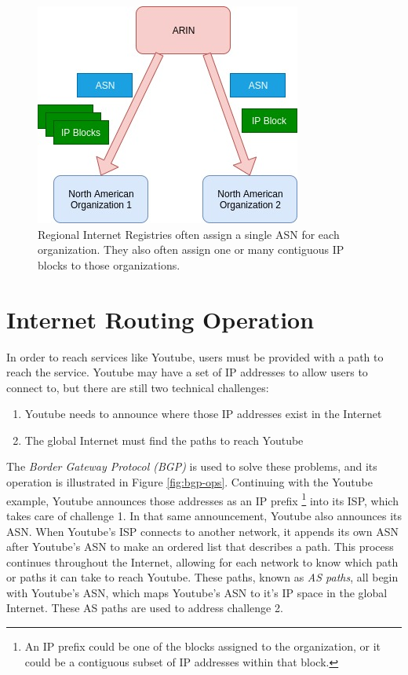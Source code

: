 \documentclass[conference]{IEEEtran}
\begin{document}
\begin{figure}
  \includegraphics[width=\linewidth]{images/rir-assignments.jpg}
  \caption{Regional Internet Registries often assign a single ASN for each organization.  They also often assign one or many contiguous IP blocks to those organizations.}
  \label{fig:rir-assignments}
\end{figure}

\section{Internet Routing Operation}
In order to reach services like Youtube, users must be provided with a path to reach the service.  Youtube may have a set of IP addresses to allow users to connect to, but there are still two technical challenges:
\begin{enumerate}
 \item Youtube needs to announce where those IP addresses exist in the Internet
 \item The global Internet must find the paths to reach Youtube
\end{enumerate}
The \emph{Border Gateway Protocol (BGP)} is used to solve these problems, and its operation is illustrated in Figure \ref{fig:bgp-ops}.  Continuing with the Youtube example, Youtube announces those addresses as an IP prefix \footnote{An IP prefix could be one of the blocks assigned to the organization, or it could be a contiguous subset of IP addresses within that block.} into its ISP, which takes care of challenge 1.  In that same announcement, Youtube also announces its ASN.  When Youtube's ISP connects to another network, it appends its own ASN after Youtube's ASN to make an ordered list that describes a path.  This process continues throughout the Internet, allowing for each network to know which path or paths it can take to reach Youtube.  These paths, known as \emph{AS paths}, all begin with Youtube's ASN, which maps Youtube's ASN to it's IP space in the global Internet.  These AS paths are used to address challenge 2.
\end{document}
